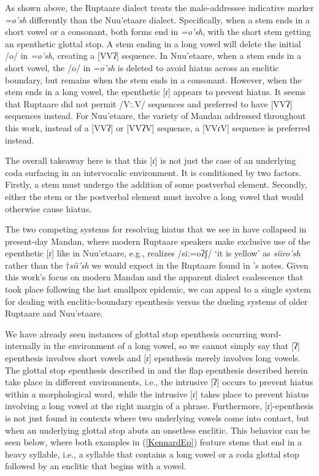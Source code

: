 As shown above, the Ruptaare dialect treats the male-addressee indicative marker \textit{=o'sh} differently than the Nuu'etaare dialect. Specifically, when a stem ends in a short vowel or a consonant, both forms end in \textit{=o'sh}, with the short stem getting an epenthetic glottal stop. A stem ending in a long vowel will delete the initial /o/ in \textit{=o'sh}, creating a [VVʔ] sequence. In Nuu'etaare, when a stem ends in a short vowel, the /o/ in \textit{=o'sh} is deleted to avoid hiatus across an enclitic boundary, but remains when the stem ends in a consonant. However, when the stem ends in a long vowel, the epenthetic [ɾ] appears to prevent hiatus. It seems that Ruptaare did not permit /Vː.V/ sequences and preferred to have [VVʔ] sequences instead. For Nuu'etaare, the variety of Mandan addressed throughout this work, instead of a [VVʔ] or [VVʔV] sequence, a [VVɾV] sequence is preferred instead.

The overall takeaway here is that this [ɾ] is not just the case of an underlying coda surfacing in an intervocalic environment. It is conditioned by two factors. Firstly, a stem must undergo the addition of some postverbal element. Secondly, either the stem or the postverbal element must involve a long vowel that would otherwise cause hiatus.

The two competing systems for resolving hiatus that we see in \citet{maximilian1839} have collapsed in present-day Mandan, where modern Ruptaare speakers make exclusive use of the epenthetic [ɾ] like in Nuu'etaare, e.g., \citet[10]{littleowl1992} realizes /siː=oʔʃ/ `it is yellow' as \textit{síiro'sh} rather than the $\dagger$\textit{síi'sh} we would expect in the Ruptaare found in \citeauthor{maximilian1839}'s notes. Given this work's focus on modern Mandan and the apparent dialect coalescence that took place following the last smallpox epidemic, we can appeal to a single system for dealing with enclitic-boundary epenthesis versus the dueling systems of older Ruptaare and Nuu'etaare.

We have already seen instances of glottal stop epenthesis occurring word-internally in the environment of a long vowel, so we cannot simply say that [ʔ] epenthesis involves short vowels and [ɾ] epenthesis merely involves long vowels. The glottal stop epenthesis described in  and the flap epenthesis described herein take place in different environments, i.e., the intrusive [ʔ] occurs to prevent hiatus within a morphological word, while the intrusive [ɾ] takes place to prevent hiatus involving a long vowel at the right margin of a phrase. Furthermore, [ɾ]-epenthesis is not just found in contexts where two underlying vowels come into contact, but when an underlying glottal stop abuts an onsetless enclitic. This behavior can be seen below, where both examples in (\ref{KennardEp}) feature stems that end in a heavy syllable, i.e., a syllable that contains a long vowel or a coda glottal stop followed by an enclitic that begins with a vowel.


